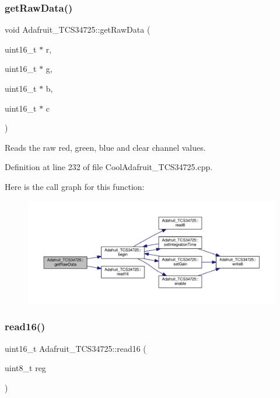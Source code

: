 \subsubsection{\texorpdfstring{get\+Raw\+Data()}{getRawData()}}
{\footnotesize\ttfamily void Adafruit\+\_\+\+T\+C\+S34725\+::get\+Raw\+Data (\begin{DoxyParamCaption}\item[{uint16\+\_\+t $\ast$}]{r,  }\item[{uint16\+\_\+t $\ast$}]{g,  }\item[{uint16\+\_\+t $\ast$}]{b,  }\item[{uint16\+\_\+t $\ast$}]{c }\end{DoxyParamCaption})}



Reads the raw red, green, blue and clear channel values. 



Definition at line 232 of file Cool\+Adafruit\+\_\+\+T\+C\+S34725.\+cpp.

Here is the call graph for this function\+:
\nopagebreak
\begin{figure}[H]
\begin{center}
\leavevmode
\includegraphics[width=350pt]{class_adafruit___t_c_s34725_abd9946a9baab1e0c76248cfe1864ea27_cgraph}
\end{center}
\end{figure}
\mbox{\label{class_adafruit___t_c_s34725_a6b9b65ff0f1e57797a1c05a43fd25385}} 
\subsubsection{\texorpdfstring{read16()}{read16()}}
{\footnotesize\ttfamily uint16\+\_\+t Adafruit\+\_\+\+T\+C\+S34725\+::read16 (\begin{DoxyParamCaption}\item[{uint8\+\_\+t}]{reg }\end{DoxyParamCaption})}



